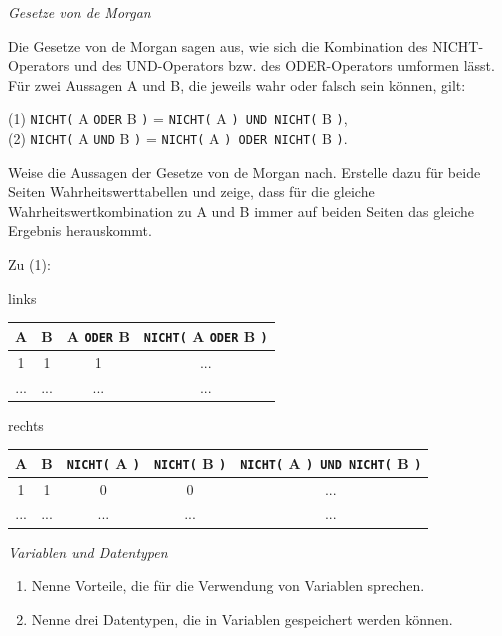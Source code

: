 \bigskip
\begin{aufgabe} \emph{Gesetze von de Morgan} \label{aufg:de-morgan}
	
	Die Gesetze von de Morgan sagen aus, wie sich die Kombination des NICHT-Operators und des UND-Operators bzw. des ODER-Operators umformen lässt. Für zwei Aussagen A und B, die jeweils wahr oder falsch sein können, gilt:
	
	\begin{center}
		(1) \texttt{NICHT(} A \texttt{ODER} B \texttt{)} = \texttt{NICHT(} A \texttt{) UND NICHT(} B \texttt{)}, \\
		(2) \texttt{NICHT(} A \texttt{UND} B \texttt{)} = \texttt{NICHT(} A \texttt{) ODER NICHT(} B \texttt{)}.
	\end{center}

	Weise die Aussagen der Gesetze von de Morgan nach. Erstelle dazu für beide Seiten Wahrheitswerttabellen und zeige, dass für die gleiche Wahrheitswertkombination zu A und B immer auf beiden Seiten das gleiche Ergebnis herauskommt.
	
	Zu (1):\smallskip
	
	\begin{minipage}{0.4\textwidth}
		\scriptsize
		links\smallskip
		
		\begin{tabular}{c|c|c|c}
			A & B & A \texttt{ODER} B & \texttt{NICHT(} A \texttt{ODER} B \texttt{)} \\ \hline
			1 & 1 & 1 		 & ... \\ \hline
			... & ... & ... & ...\\
		\end{tabular}
	\end{minipage}
	\hfill
	\begin{minipage}{0.58\textwidth}
		\scriptsize
		rechts\smallskip

		\begin{tabular}{c|c|c|c|c}
			A & B & \texttt{NICHT(} A \texttt{)} & \texttt{NICHT(} B \texttt{)} & \texttt{NICHT(} A \texttt{) UND NICHT(} B \texttt{)} \\ \hline
			1 & 1 & 0 		   & 0          & ... \\ \hline
			... & ... & ... & ... & ...\\
		\end{tabular}			
	\end{minipage}
\end{aufgabe}

\bigskip
\begin{aufgabe} \emph{Variablen und Datentypen} \label{aufg:variablen-datentypen}
	
	\begin{enumerate}[label=\alph*), itemsep=0ex]
		\item Nenne Vorteile, die für die Verwendung von Variablen sprechen.
		\item Nenne drei Datentypen, die in Variablen gespeichert werden können.
	\end{enumerate}
\end{aufgabe}

